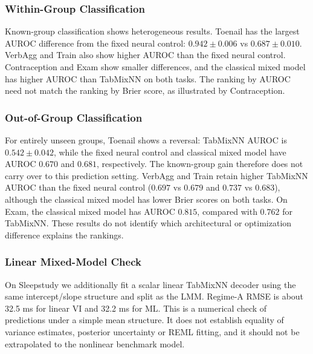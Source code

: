 
\FloatBarrier

\subsubsection{Within-Group Classification}
Known-group classification shows heterogeneous results. Toenail has the largest AUROC difference from the fixed neural control: $0.942 \pm 0.006$ vs $0.687 \pm 0.010$. VerbAgg and Train also show higher AUROC than the fixed neural control. Contraception and Exam show smaller differences, and the classical mixed model has higher AUROC than TabMixNN on both tasks. The ranking by AUROC need not match the ranking by Brier score, as illustrated by Contraception.


\FloatBarrier

\subsubsection{Out-of-Group Classification}
For entirely unseen groups, Toenail shows a reversal: TabMixNN AUROC is $0.542 \pm 0.042$, while the fixed neural control and classical mixed model have AUROC $0.670$ and $0.681$, respectively. The known-group gain therefore does not carry over to this prediction setting. VerbAgg and Train retain higher TabMixNN AUROC than the fixed neural control ($0.697$ vs $0.679$ and $0.737$ vs $0.683$), although the classical mixed model has lower Brier scores on both tasks. On Exam, the classical mixed model has AUROC $0.815$, compared with $0.762$ for TabMixNN. These results do not identify which architectural or optimization difference explains the rankings.


\FloatBarrier

\subsubsection{Linear Mixed-Model Check}
On Sleepstudy we additionally fit a scalar linear TabMixNN decoder using the same intercept/slope structure and split as the LMM. Regime-A RMSE is about 32.5 ms for linear VI and 32.2 ms for ML. This is a numerical check of predictions under a simple mean structure. It does not establish equality of variance estimates, posterior uncertainty or REML fitting, and it should not be extrapolated to the nonlinear benchmark model.


\FloatBarrier

